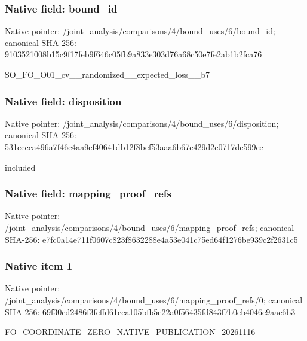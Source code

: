 \documentclass[10pt,a4paper]{article}
\begin{document}
\subsubsection{Native field: bound\_\allowbreak{}id}
Native pointer: /joint\_\allowbreak{}analysis/comparisons/4/bound\_\allowbreak{}uses/6/bound\_\allowbreak{}id; canonical SHA-256: 9103521008b15c9f17feb9f646c05fb9a833e303d76a68c50e7fe2ab1b2fca76

\begingroup\raggedright\sloppy SO\_\allowbreak{}FO\_\allowbreak{}O01\_\allowbreak{}cv\_\allowbreak{}\_\allowbreak{}randomized\_\allowbreak{}\_\allowbreak{}expected\_\allowbreak{}loss\_\allowbreak{}\_\allowbreak{}b7\par\endgroup

\subsubsection{Native field: disposition}
Native pointer: /joint\_\allowbreak{}analysis/comparisons/4/bound\_\allowbreak{}uses/6/disposition; canonical SHA-256: 531cecca496a7f46e4aa9ef40641db12f8bef53aaa6b67c429d2c0717dc599ce

\begingroup\raggedright\sloppy included\par\endgroup

\subsubsection{Native field: mapping\_\allowbreak{}proof\_\allowbreak{}refs}
Native pointer: /joint\_\allowbreak{}analysis/comparisons/4/bound\_\allowbreak{}uses/6/mapping\_\allowbreak{}proof\_\allowbreak{}refs; canonical SHA-256: e7fc0a14e711f0607c823f8632288e4a53e041c75ed64f1276be939c2f2631c5

\subsubsection{Native item 1}
Native pointer: /joint\_\allowbreak{}analysis/comparisons/4/bound\_\allowbreak{}uses/6/mapping\_\allowbreak{}proof\_\allowbreak{}refs/0; canonical SHA-256: 69f30cd2486f3fcffd61cca105bfb5e22a0f56435fd843f7b0eb4046c9aac6b3

\begingroup\raggedright\sloppy FO\_\allowbreak{}COORDINATE\_\allowbreak{}ZERO\_\allowbreak{}NATIVE\_\allowbreak{}PUBLICATION\_\allowbreak{}20261116\par\endgroup
\end{document}
